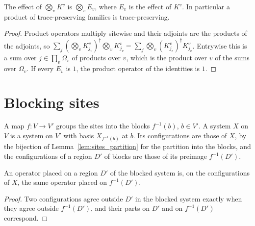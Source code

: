 \begin{theorem}
    \label{thm:sites_product_family_tp}
    \leanok
    The effect of $\bigotimes_vK^v$ is $\bigotimes_vE_v$, where $E_v$ is the effect of $K^v$.
    In particular a product of trace-preserving families is trace-preserving.
\end{theorem}
\begin{proof}\leanok
    Product operators multiply sitewise and their adjoints are the products of the
    adjoints, so
    $\sum_j(\bigotimes_vK^v_{j_v})^\dagger\bigotimes_vK^v_{j_v}
    =\sum_j\bigotimes_v(K^v_{j_v})^\dagger K^v_{j_v}$. Entrywise this is a sum over
    $j\in\prod_v\Omega_v$ of products over $v$, which is the product over $v$ of the sums
    over $\Omega_v$. If every $E_v$ is $1$, the product operator of the identities is $1$.
\end{proof}

\section{Blocking sites}
\label{sec:sites_block}

\begin{definition}
    \label{def:sites_block}
    \leanok
    A map $f:V\to V'$ groups the sites into the blocks $f^{-1}(b)$, $b\in V'$. A system
    $X$ on $V$ is a system on $V'$ with basis $X_{f^{-1}(b)}$ at $b$. Its configurations
    are those of $X$, by the bijection of Lemma~\ref{lem:sites_partition} for the
    partition into the blocks, and the configurations of a region $D'$ of blocks are
    those of its preimage $f^{-1}(D')$.
\end{definition}

\begin{lemma}
    \label{lem:sites_block_place}
    \leanok
    An operator placed on a region $D'$ of the blocked system is, on the configurations
    of $X$, the same operator placed on $f^{-1}(D')$.
\end{lemma}
\begin{proof}\leanok
    Two configurations agree outside $D'$ in the blocked system exactly when they agree
    outside $f^{-1}(D')$, and their parts on $D'$ and on $f^{-1}(D')$ correspond.
\end{proof}

